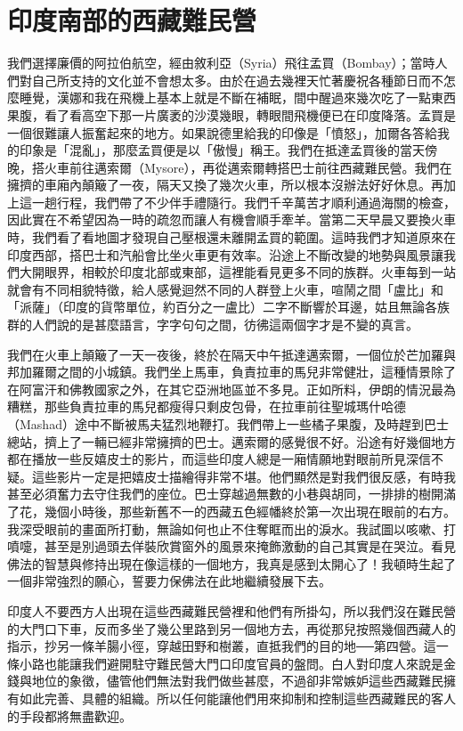 \chapter{印度南部的西藏難民營}

我們選擇廉價的阿拉伯航空，經由敘利亞（Syria）飛往孟買（Bombay）；當時人們對自己所支持的文化並不會想太多。由於在過去幾裡天忙著慶祝各種節日而不怎麼睡覺，漢娜和我在飛機上基本上就是不斷在補眠，間中醒過來幾次吃了一點東西果腹，看了看高空下那一片廣袤的沙漠幾眼，轉眼間飛機便已在印度降落。孟買是一個很難讓人振奮起來的地方。如果說德里給我的印像是「憤怒」，加爾各答給我的印象是「混亂」，那麼孟買便是以「傲慢」稱王。我們在抵達孟買後的當天傍晚，搭火車前往邁索爾（Mysore），再從邁索爾轉搭巴士前往西藏難民營。我們在擁擠的車廂內顛簸了一夜，隔天又換了幾次火車，所以根本沒辦法好好休息。再加上這一趟行程，我們帶了不少伴手禮隨行。我們千辛萬苦才順利通過海關的檢查，因此實在不希望因為一時的疏忽而讓人有機會順手牽羊。當第二天早晨又要換火車時，我們看了看地圖才發現自己壓根還未離開孟買的範圍。這時我們才知道原來在印度西部，搭巴士和汽船會比坐火車更有效率。沿途上不斷改變的地勢與風景讓我們大開眼界，相較於印度北部或東部，這裡能看見更多不同的族群。火車每到一站就會有不同相貌特徵，給人感覺迴然不同的人群登上火車，喧鬧之間「盧比」和「派薩」（印度的貨幣單位，約百分之一盧比）二字不斷響於耳邊，姑且無論各族群的人們說的是甚麼語言，字字句句之間，彷彿這兩個字才是不變的真言。

我們在火車上顛簸了一天一夜後，終於在隔天中午抵達邁索爾，一個位於芒加羅與邦加羅爾之間的小城鎮。我們坐上馬車，負責拉車的馬兒非常健壯，這種情景除了在阿富汗和佛教國家之外，在其它亞洲地區並不多見。正如所料，伊朗的情況最為糟糕，那些負責拉車的馬兒都瘦得只剩皮包骨，在拉車前往聖城瑪什哈德（Mashad）途中不斷被馬夫猛烈地鞭打。我們帶上一些橘子果腹，及時趕到巴士總站，擠上了一輛已經非常擁擠的巴士。邁索爾的感覺很不好。沿途有好幾個地方都在播放一些反嬉皮士的影片，而這些印度人總是一廂情願地對眼前所見深信不疑。這些影片一定是把嬉皮士描繪得非常不堪。他們顯然是對我們很反感，有時我甚至必須奮力去守住我們的座位。巴士穿越過無數的小巷與胡同，一排排的樹開滿了花，幾個小時後，那些新舊不一的西藏五色經幡終於第一次出現在眼前的右方。我深受眼前的畫面所打動，無論如何也止不住奪眶而出的淚水。我試圖以咳嗽、打噴嚏，甚至是別過頭去佯裝欣賞窗外的風景來掩飾激動的自己其實是在哭泣。看見佛法的智慧與修持出現在像這樣的一個地方，我真是感到太開心了！我頓時生起了一個非常強烈的願心，誓要力保佛法在此地繼續發展下去。

印度人不要西方人出現在這些西藏難民營裡和他們有所掛勾，所以我們沒在難民營的大門口下車，反而多坐了幾公里路到另一個地方去，再從那兒按照幾個西藏人的指示，抄另一條羊腸小徑，穿越田野和樹叢，直抵我們的目的地──第四營。這一條小路也能讓我們避開駐守難民營大門口印度官員的盤問。白人對印度人來說是金錢與地位的象徵，儘管他們無法對我們做些甚麼，不過卻非常嫉妒這些西藏難民擁有如此完善、具體的組織。所以任何能讓他們用來抑制和控制這些西藏難民的客人的手段都將無盡歡迎。

